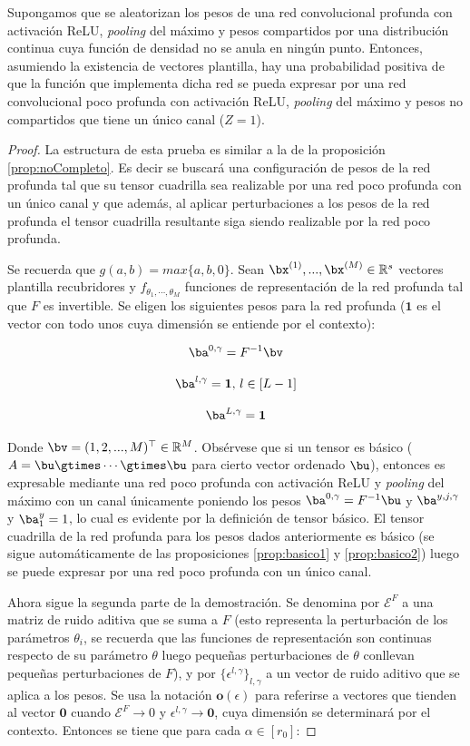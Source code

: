 \begin{prop}
Supongamos que se aleatorizan los pesos de una red convolucional profunda con activación ReLU, \textit{pooling} del máximo y pesos compartidos por una distribución continua cuya función de densidad no se anula en ningún punto. Entonces, asumiendo la existencia de vectores plantilla, hay una probabilidad positiva de que la función que implementa dicha red se pueda expresar por una red convolucional poco profunda con activación ReLU, \textit{pooling} del máximo y pesos no compartidos que tiene un único canal ($Z = 1$).
\end{prop}
\begin{proof}
La estructura de esta prueba es similar a la de la proposición \ref{prop:noCompleto}. Es decir se buscará una configuración de pesos de la red profunda tal que su tensor cuadrilla sea realizable por una red poco profunda con un único canal y que además, al aplicar perturbaciones a los pesos de la red profunda el tensor cuadrilla resultante siga siendo realizable por la red poco profunda.

Se recuerda que $g(a,b) = \textit{max}\{a,b,0\}$. Sean $\bx^{(1)},... ,\bx^{(M)} \in \mathbb{R}^s$ vectores plantilla recubridores y $f_{\theta_1,\cdots ,\theta_M}$ funciones de representación de la red profunda tal que $F$ es invertible. Se eligen los siguientes pesos para la red profunda ($\mathbf{1}$ es el vector con todo unos cuya dimensión se entiende por el contexto):

$$
\ba^{0,\gamma} = F^{-1}\bv
$$

$$
\ba^{l,\gamma} = \mathbf{1}, \, l\in[L-1]
$$

$$
\ba^{L,\gamma} = \mathbf{1}
$$

Donde $\bv = (1,2,... ,M)^\top \in \mathbb{R}^M$. Obsérvese que si un tensor es básico ($A = \bu \gtimes \cdots  \gtimes \bu$ para cierto vector ordenado $\bu$), entonces es expresable mediante una red poco profunda con activación ReLU y \textit{pooling} del máximo con un canal únicamente poniendo los pesos $\ba^{0,\gamma} = F^{-1}\bu$ y $\ba^{y,j,\gamma}$ y $\ba^y_1 = 1$, lo cual es evidente por la definición de tensor básico. El tensor cuadrilla de la red profunda para los pesos dados anteriormente es básico (se sigue automáticamente de las proposiciones \ref{prop:basico1} y \ref{prop:basico2}) luego se puede expresar por una red poco profunda con un único canal.


Ahora sigue la segunda parte de la demostración. Se denomina por $\mathcal{E}^F$ a una matriz de ruido aditiva que se suma a $F$ (esto representa la perturbación de los parámetros $\theta_i$, se recuerda que las funciones de representación son continuas respecto de su parámetro $\theta$ luego pequeñas perturbaciones de $\theta$ conllevan pequeñas perturbaciones de $F$), y por $\{\mathbb{\epsilon}^{l,\gamma}\}_{l,\gamma}$ a un vector de ruido aditivo que se aplica a los pesos. Se usa la notación $\textbf{o}(\epsilon)$ para referirse a vectores que tienden al vector $\mathbf{0}$ cuando $\mathcal{E}^F \rightarrow 0$ y $\epsilon^{l,\gamma} \rightarrow \mathbf{0}$, cuya dimensión se determinará por el contexto. Entonces se tiene que para cada $\alpha \in [r_0]$: 


\end{proof}
